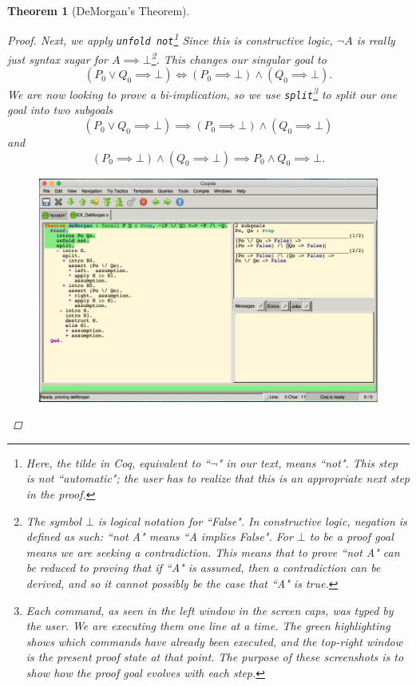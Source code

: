 \documentclass[12pt,notitlepage]{report}
\theoremstyle{plain}
\newtheorem{theo}{Theorem}[section]
\theoremstyle{definition}
\numberwithin{equation}{section}
\begin{document}
\begin{theo}[DeMorgan's Theorem]
\begin{proof}
        \par \medskip
        Next, we apply \texttt{unfold not}\footnote{Here, the tilde in Coq, equivalent to ``$\neg$" in our text, means ``not".  This step is not ``automatic"; the user has to realize that this is an appropriate next step in the proof.}  Since this is constructive logic, $\neg A$ is really just syntax sugar for $A \implies \bot$\footnote{The symbol $\bot$ is logical notation \cite{vanDalen} for ``False".  In constructive logic, negation is defined as such: ``not A" means ``A implies False".  For $\bot$ to be a proof goal means we are seeking a contradiction.  This means that to prove ``not A" can be reduced to proving that \emph{if} ``A" is assumed, then a contradiction can be derived, and so it cannot possibly be the case that ``A" is true.}.  This changes our singular goal to
        \[
        (P_0 \lor Q_0 \implies \bot) \Longleftrightarrow (P_0 \implies \bot) \land (Q_0 \implies \bot).
        \]
        We are now looking to prove a bi-implication, so we use \texttt{split}\footnote{Each command, as seen in the left window in the screen caps, was typed by the user.  We are executing them one line at a time.  The green highlighting shows which commands have already been executed, and the top-right window is the present proof state at that point.  The purpose of these screenshots is to show how the proof goal evolves with each step.} to split our one goal into two subgoals
        \begin{equation}\label{DMforward}
            (P_0 \lor Q_0 \implies \bot)\implies (P_0 \implies \bot) \land (Q_0 \implies \bot)
        \end{equation}
        and
        \begin{equation}\label{DMbackward}
            (P_0 \implies \bot) \land (Q_0 \implies \bot) \implies P_0 \land Q_0 \implies \bot.
        \end{equation}
        \par \medskip
        \noindent
\begin{figure}[H]
    \centering
          \includegraphics[scale=0.45]{DeMorgan2}

\end{figure}
\end{proof}
\end{theo}
\end{document}
